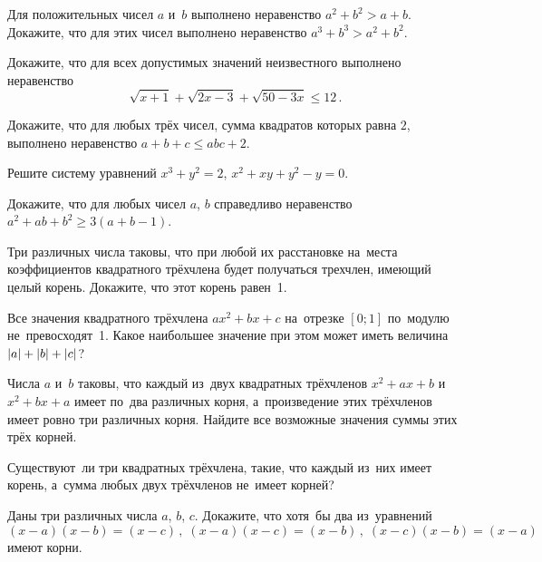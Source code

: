 \begin{problems}

\item
Для положительных чисел $a$ и~$b$ выполнено неравенство $a^2 + b^2 > a + b$.
Докажите, что для этих чисел выполнено неравенство $a^3 + b^3 > a^2 + b^2$.

\item
Докажите, что для всех допустимых значений неизвестного выполнено неравенство
\[
    \sqrt{x + 1} + \sqrt{2 x - 3} + \sqrt{50 - 3 x} \leq 12
\, . \]

\item
Докажите, что для любых трёх чисел, сумма квадратов которых равна $2$,
выполнено неравенство $a + b + c \leq a b c + 2$.

\item
Решите систему уравнений $x^3 + y^2 = 2$, $x^2 + x y + y^2 - y = 0$.

\item
Докажите, что для любых чисел $a$, $b$ справедливо неравенство
$a^2 + a b + b^2 \geq 3 (a + b - 1)$.

\item
Три различных числа таковы, что при любой их расстановке на~места коэффициентов
квадратного трёхчлена будет получаться трехчлен, имеющий целый корень.
Докажите, что этот корень равен~1.

\item
Все значения квадратного трёхчлена $a x^2 + b x + c$ на~отрезке $[0; 1]$
по~модулю не~превосходят~1.
Какое наибольшее значение при этом может иметь величина
$\lvert a \rvert + \lvert b \rvert + \lvert c \rvert$?

\item
Числа $a$ и~$b$ таковы, что каждый из~двух квадратных трёхчленов
$x^2 + a x + b$ и~$x^2 + b x + a$ имеет по~два различных корня, а~произведение
этих трёхчленов имеет ровно три различных корня.
Найдите все возможные значения суммы этих трёх корней.

\item
Существуют~ли три квадратных трёхчлена, такие, что каждый из~них имеет корень,
а~сумма любых двух трёхчленов не~имеет корней?

\item
Даны три различных числа $a$, $b$, $c$.
Докажите, что хотя~бы два из~уравнений
\[
    (x - a) (x - b) = (x - c)
\, , \;
    (x - a) (x - c) = (x - b)
\, , \;
    (x - c) (x - b) = (x - a)
\]
имеют корни.

\end{problems}

\endgroup %

